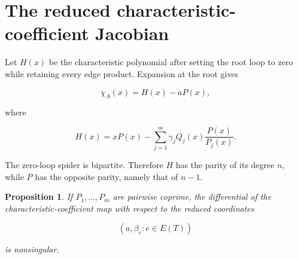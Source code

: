 \documentclass[11pt]{article}
\newtheorem{proposition}[theorem]{Proposition}
\theoremstyle{remark}
\begin{document}
\section{The reduced characteristic-coefficient Jacobian}

Let $H(x)$ be the characteristic polynomial after setting the root loop to zero while retaining every edge product. Expansion at the root gives

\[
\chi_A(x)=H(x)-aP(x),
\tag{5.1}
\]

where

\[
H(x)=xP(x)-\sum_{j=1}^m
\gamma_jQ_j(x)\frac{P(x)}{P_j(x)}.
\tag{5.2}
\]

The zero-loop spider is bipartite. Therefore $H$ has the parity of its degree $n$, while $P$ has the opposite parity, namely that of $n-1$.

\begin{proposition}

If $P_1,\ldots,P_m$ are pairwise coprime, the differential of the characteristic-coefficient map with respect to the reduced coordinates

\[
(a,\beta_e:e\in E(T))
\]

is nonsingular.
\end{proposition}
\end{document}
